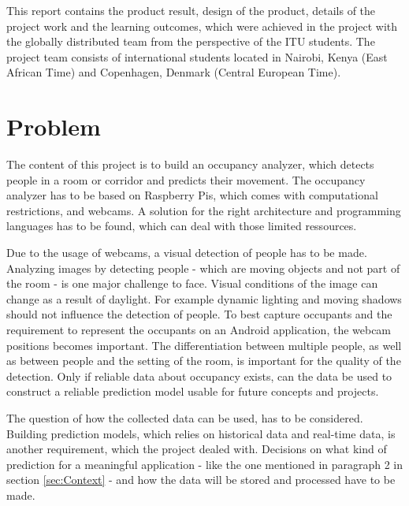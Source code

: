 This report contains the product result, design of the product, details of the project work and the learning outcomes, which were achieved in the project with the globally distributed team from the perspective of the ITU students. The project team consists of international students located in Nairobi, Kenya (East African Time) and Copenhagen, Denmark (Central European Time).


\section{Problem}


The content of this project is to build an occupancy analyzer, which detects people in a room or corridor and predicts their movement. The occupancy analyzer has to be based on Raspberry Pis, which comes with computational restrictions, and webcams. A solution for the right architecture and programming languages has to be found, which can deal with those limited ressources.

Due to the usage of webcams, a visual detection of people has to be made. Analyzing images by detecting people - which are moving objects and not part of the room - is one major challenge to face. Visual conditions of the image can change as a result of daylight. For example dynamic lighting and moving shadows should not influence the detection of people. 
To best capture occupants and the requirement to represent the occupants on an Android application, the webcam positions becomes important.
The differentiation between multiple people, as well as between people and the setting of the room, is important for the quality of the detection. Only if reliable data about occupancy exists, can the data be used to construct a reliable prediction model usable for future concepts and projects.

The question of how the collected data can be used, has to be considered. Building prediction models, which relies on historical data and real-time data, is another requirement, which the project dealed with. Decisions on what kind of prediction for a meaningful application - like the one mentioned in paragraph 2 in section \ref{sec:Context} - and how the data will be stored and processed have to be made.

